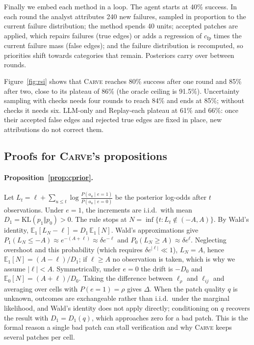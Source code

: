 \documentclass[11pt]{article}
\newcommand{\carve}{\textsc{Carve}}
\begin{document}
Finally we embed each method in a loop. The agent starts at 40\% success. In each round the analyst attributes 240 new failures, sampled in proportion to the current failure distribution; the method spends 40 units; accepted patches are applied, which repairs failures (true edges) or adds a regression of $c_{\mathrm{fp}}$ times the current failure mass (false edges); and the failure distribution is recomputed, so priorities shift towards categories that remain. Posteriors carry over between rounds.

Figure~\ref{fig:rsi} shows that \carve{} reaches 80\% success after one round and 85\% after two, close to its plateau of 86\% (the oracle ceiling is 91.5\%). Uncertainty sampling with checks needs four rounds to reach 84\% and ends at 85\%; without checks it needs six. LLM-only and Replay-each plateau at 61\% and 66\%: once their accepted false edges and rejected true edges are fixed in place, new attributions do not correct them.


\subsection{Proofs for \carve{}'s propositions}
\label{app:cproofs}

\paragraph{Proposition~\ref{prop:cprior}.} Let $L_t=\ell+\sum_{u\le t}\log\frac{P(o_u\mid e=1)}{P(o_u\mid e=0)}$ be the posterior log-odds after $t$ observations. Under $e=1$, the increments are i.i.d.\ with mean $D_1=\mathrm{KL}(p_1\Vert p_0)>0$. The rule stops at $N=\inf\{t: L_t\notin(-A,A)\}$. By Wald's identity, $\mathbb{E}_1[L_N-\ell]=D_1\,\mathbb{E}_1[N]$. Wald's approximations give $P_1(L_N\le -A)\approx e^{-(A+\ell)}\approx\delta e^{-\ell}$ and $P_0(L_N\ge A)\approx\delta e^{\ell}$. Neglecting overshoot and this probability (which requires $\delta e^{|\ell|}\ll1$), $L_N=A$, hence $\mathbb{E}_1[N]=(A-\ell)/D_1$; if $\ell\ge A$ no observation is taken, which is why we assume $|\ell|<A$. Symmetrically, under $e=0$ the drift is $-D_0$ and $\mathbb{E}_0[N]=(A+\ell)/D_0$. Taking the difference between $\ell_\rho$ and $\ell_{ij}$ and averaging over cells with $P(e{=}1)=\rho$ gives $\Delta$. When the patch quality $q$ is unknown, outcomes are exchangeable rather than i.i.d.\ under the marginal likelihood, and Wald's identity does not apply directly; conditioning on $q$ recovers the result with $D_1=D_1(q)$, which approaches zero for a bad patch. This is the formal reason a single bad patch can stall verification and why \carve{} keeps several patches per cell.
\end{document}

